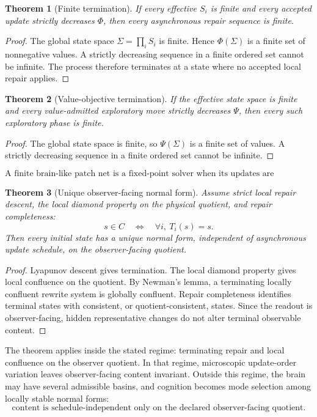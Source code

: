 \documentclass[11pt]{article}
\newtheorem{theorem}{Theorem}[section]
\theoremstyle{remark}
\theoremstyle{plain}
\begin{document}
\begin{theorem}[Finite termination]
If every effective \(S_i\) is finite and every accepted update strictly decreases \(\Phi\), then every asynchronous repair sequence is finite.
\end{theorem}

\begin{proof}
The global state space \(\Sigma=\prod_i S_i\) is finite. Hence \(\Phi(\Sigma)\) is a finite set of nonnegative values. A strictly decreasing sequence in a finite ordered set cannot be infinite. The process therefore terminates at a state where no accepted local repair applies.
\end{proof}

\begin{theorem}[Value-objective termination]
If the effective state space is finite and every value-admitted exploratory move strictly decreases \(\Psi\), then every such exploratory phase is finite.
\end{theorem}

\begin{proof}
The global state space is finite, so \(\Psi(\Sigma)\) is a finite set of values. A strictly decreasing sequence in a finite ordered set cannot be infinite.
\end{proof}

\[
\boxed{
\text{A finite brain-like patch net is a fixed-point solver when its updates are mismatch-decreasing.}
}
\]

\begin{theorem}[Unique observer-facing normal form]
Assume strict local repair descent, the local diamond property on the physical quotient, and repair completeness:
\[
s\in C
\quad\Longleftrightarrow\quad
\forall i,\ T_i(s)=s.
\]
Then every initial state has a unique normal form, independent of asynchronous update schedule, on the observer-facing quotient.
\end{theorem}

\begin{proof}
Lyapunov descent gives termination. The local diamond property gives local confluence on the quotient. By Newman's lemma, a terminating locally confluent rewrite system is globally confluent. Repair completeness identifies terminal states with consistent, or quotient-consistent, states. Since the readout is observer-facing, hidden representative changes do not alter terminal observable content.
\end{proof}

The theorem applies inside the stated regime: terminating repair and local confluence on the observer quotient. In that regime, microscopic update-order variation leaves observer-facing content invariant. Outside this regime, the brain may have several admissible basins, and cognition becomes mode selection among locally stable normal forms:
\[
\boxed{
\text{content is schedule-independent only on the declared observer-facing quotient.}
}
\]
\end{document}
